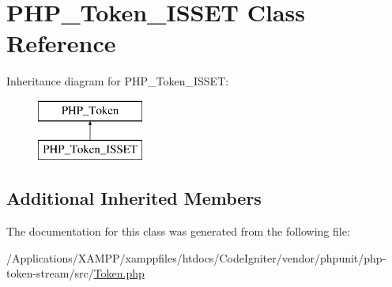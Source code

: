 \hypertarget{class_p_h_p___token___i_s_s_e_t}{}\section{P\+H\+P\+\_\+\+Token\+\_\+\+I\+S\+S\+ET Class Reference}
\label{class_p_h_p___token___i_s_s_e_t}
Inheritance diagram for P\+H\+P\+\_\+\+Token\+\_\+\+I\+S\+S\+ET\+:\begin{figure}[H]
\begin{center}
\leavevmode
\includegraphics[height=2.000000cm]{class_p_h_p___token___i_s_s_e_t}
\end{center}
\end{figure}
\subsection*{Additional Inherited Members}


The documentation for this class was generated from the following file\+:\begin{DoxyCompactItemize}
\item 
/\+Applications/\+X\+A\+M\+P\+P/xamppfiles/htdocs/\+Code\+Igniter/vendor/phpunit/php-\/token-\/stream/src/\mbox{\hyperlink{_token_8php}{Token.\+php}}\end{DoxyCompactItemize}
